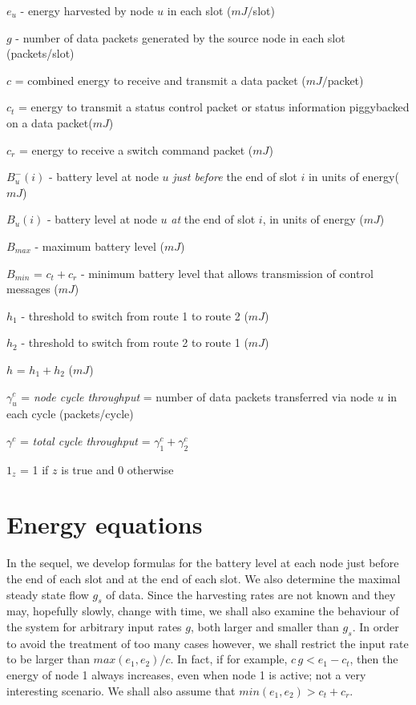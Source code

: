 \documentclass[12 pt]{article}
\newcommand{\debug}[1]{\mbox{\tt #1}}
\renewcommand{\debug}[1]{}              \newcommand{\cmd}[1]{}
\newcommand{\2}{\>\>}
\newcommand{\3}{\>\>\>}
\newcommand{\4}{\>\>\>\>}
\newcommand{\5}{\>\>\>\>\>}
\newcommand{\6}{\>\>\>\>\>\>}
\newcommand{\7}{\6\>}
\newcommand{\8}{\6\2}
\newcommand{\sname}{}
\newcommand{\dlabelx}[1]{\debug{\fbox{\tiny #1}}\label{#1}}
\newcommand{\msec}[2]{\renewcommand{\sname}{}\section[#1
	\debug{\fbox {#2}}]{#1 \cmd{msec} \dlabelx{#2}}\markboth{\today}{Sec. \thesection}}
\begin{document}
\begin{description}
\item{$e_u$} - energy harvested by node $u$ in each slot  ($mJ/$slot)
\item{$g$} - number of data packets generated by the source node in each slot (packets/slot)
\item{$c$} = combined energy to receive and transmit a data packet ($mJ/$packet)
\item{$c_t$} = energy to transmit a status control packet or status information piggybacked on a data packet($mJ$)
\item{$c_r$} = energy to receive a switch command packet ($mJ$)
\item{$B^{-}_u(i)$} - battery level at node $u$ \emph{just before} the end of slot $i$ in units of energy($mJ$)
\item{$B_u(i)$} - battery level at node $u$ \emph{at} the end of slot $i$, in units of energy ($mJ$)
\item{$B_{max}$} - maximum battery level ($mJ$)
\item{$B_{min}$} = $c_t + c_r$ - minimum battery level that allows transmission of control messages ($mJ$)
\item{$h_1$} - threshold to switch from route 1 to route 2 ($mJ$)
\item{$h_2$} - threshold to switch from route 2 to route 1 ($mJ$)
\item {$h$} = $h_1+h_2$ ($mJ$)
\item {$\gamma^c_u$} = \emph{node cycle throughput} = number of data packets transferred via node $u$ in each cycle (packets/cycle)
\item {$\gamma^c$} = \emph{total cycle throughput} = $\gamma^c_1 + \gamma^c_2$
\item{$1_z$} = 1 if $z$ is true and $0$ otherwise
\end{description}



\msec{Energy equations}{energy}

In the sequel, we develop formulas for the battery level at each node just before the end of each slot and at the end of each slot.  We also determine the maximal steady state flow  $g_s$ of data.
Since the harvesting rates are not known and they may, hopefully slowly, change with time, we shall also examine the behaviour of the system for arbitrary input rates $g$, both larger and smaller than $g_s$.
In order to avoid the treatment of too many cases however, we shall restrict the input rate to be larger than $max(e_1 ,e_2)/c$.  In fact, if for example, $c\,g < e_1 - c_t$, then the energy of node 1 always increases, even when node 1 is active; not a very interesting scenario.  We shall also assume that $min(e_1, e_2) > c_t + c_r$.
\end{document}
